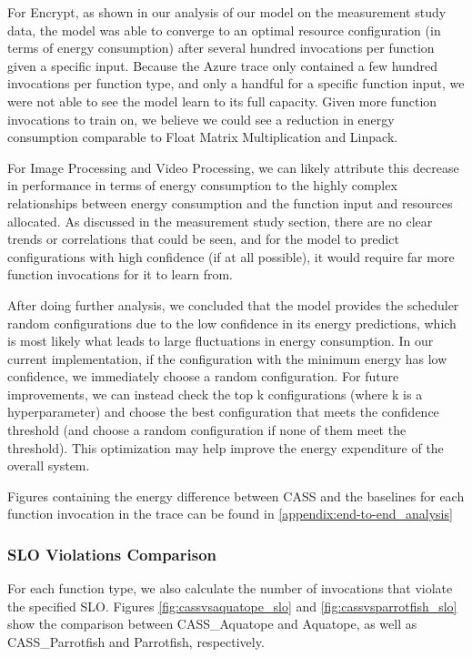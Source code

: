 \documentclass[times, 10pt,twocolumn]{article}
\begin{document}
For Encrypt, as shown in our analysis of our model on the measurement study data, the model was able to converge to an optimal resource configuration (in terms of energy consumption) after several hundred invocations per function given a specific input. Because the Azure trace only contained a few hundred invocations per function type, and only a handful for a specific function input, we were not able to see the model learn to its full capacity. Given more function invocations to train on, we believe we could see a reduction in energy consumption comparable to Float Matrix Multiplication and Linpack.

For Image Processing and Video Processing, we can likely attribute this decrease in performance in terms of energy consumption to the highly complex relationships between energy consumption and the function input and resources allocated. As discussed in the measurement study section, there are no clear trends or correlations that could be seen, and for the model to predict configurations with high confidence (if at all possible), it would require far more function invocations for it to learn from. 

After doing further analysis, we concluded that the model provides the scheduler random configurations due to the low confidence in its energy predictions, which is most likely what leads to large fluctuations in energy consumption. In our current implementation, if the configuration with the minimum energy has low confidence, we immediately choose a random configuration. For future improvements, we can instead check the top k configurations (where k is a hyperparameter) and choose the best configuration that meets the confidence threshold (and choose a random configuration if none of them meet the threshold). This optimization may help improve the energy expenditure of the overall system. 

Figures containing the energy difference between CASS and the baselines for each function invocation in the trace can be found in \ref{appendix:end-to-end_analysis}

\subsubsection{SLO Violations Comparison}

For each function type, we also calculate the number of invocations that violate the specified SLO. Figures \ref{fig:cassvsaquatope_slo} and \ref{fig:cassvsparrotfish_slo} show the comparison between CASS\_Aquatope and Aquatope, as well as CASS\_Parrotfish and Parrotfish, respectively. 
\end{document}
